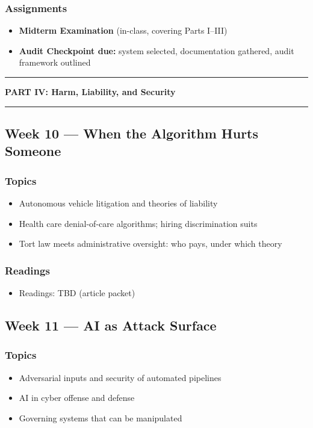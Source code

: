 \documentclass[12pt]{article}
\begin{document}
    \subsubsection*{Assignments}
        \begin{itemize}
            \item \textbf{Midterm Examination} (in-class, covering Parts I--III)
            \item \textbf{Audit Checkpoint due:} system selected, documentation gathered, audit framework outlined
        \end{itemize}

\bigskip
\noindent\rule{\textwidth}{0.6pt}
\begin{center}\textbf{PART IV: Harm, Liability, and Security}\end{center}
\noindent\rule{\textwidth}{0.6pt}

\subsection*{Week 10 --- When the Algorithm Hurts Someone}
    \subsubsection*{Topics}
        \begin{itemize}
            \item Autonomous vehicle litigation and theories of liability
            \item Health care denial-of-care algorithms; hiring discrimination suits
            \item Tort law meets administrative oversight: who pays, under which theory
        \end{itemize}
    \subsubsection*{Readings}
        \begin{itemize}
            \item Readings: TBD (article packet)
        \end{itemize}

\subsection*{Week 11 --- AI as Attack Surface}
    \subsubsection*{Topics}
        \begin{itemize}
            \item Adversarial inputs and security of automated pipelines
            \item AI in cyber offense and defense
            \item Governing systems that can be manipulated
        \end{itemize}
\end{document}
